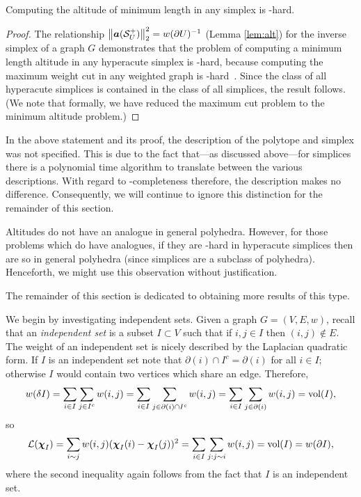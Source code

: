 \begin{lemma}
	\label{lem:altitude_hard}
	Computing the altitude of minimum length in any simplex is \NP-hard. 
\end{lemma}
\begin{proof}
	The relationship $\norm{\vb*{a}(\mathcal{S}^+_U)}_2^2 = w(\partial U)^{-1}$ (Lemma \ref{lem:alt}) for the inverse simplex of a graph $G$ demonstrates that the problem of computing a minimum length altitude in any hyperacute simplex is \NP-hard, because computing the  maximum weight cut in any weighted graph is \NP-hard~\cite{karp1972reducibility}.  Since the  class  of all hyperacute simplices is contained in the class of all simplices, the result follows.  (We note that formally, we have reduced the maximum  cut problem to the minimum altitude problem.) 
\end{proof}

\begin{remark} In  the above statement and its proof, the description of the polytope and simplex was not specified. This is due to the fact that---as discussed above---for simplices there is a polynomial time algorithm to translate between the various descriptions. With regard to \NP-completeness therefore, the description makes no difference. Consequently, we will continue to ignore this distinction for the remainder of this section. 
\end{remark}


\begin{remark}
Altitudes do  not have  an analogue in general polyhedra. However, for  those problems which do have analogues, 
if they are \NP-hard in hyperacute simplices then are so in general polyhedra (since simplices are a subclass of polyhedra). Henceforth, we might use this observation  without justification. 
\end{remark}


The remainder of this section is dedicated to obtaining more results of this type. 

We begin by investigating independent sets. Given a graph $G=(V,E,w)$, recall that an \emph{independent set} is a subset $I\subset V$ such that if $i,j\in I$ then $(i,j)\notin E$. 
The weight of an independent set is nicely described by the Laplacian quadratic form. If $I$ is an independent set note that $\partial(i)\cap I^c=\partial(i)$ for all $i\in  I$; otherwise $I$ would contain two vertices  which share an edge.
Therefore, 
\begin{align*}
w(\delta I) = \sum_{i\in  I}\sum_{j\in I^c} w(i,j) = \sum_{i\in I}\sum_{j\in \partial(i)\cap I^c} w(i,j) = \sum_{i\in  I}\sum_{j\in  \partial(i)}w(i,j) = \textnormal{vol}(I),
\end{align*}
so
\begin{align*}
    \mathcal{L}(\boldsymbol{\chi}_I) = \sum_{i\sim j}w(i,j)(\boldsymbol{\chi}_I(i)-\boldsymbol{\chi}_I(j))^2 = \sum_{i\in I}\sum_{j:j\sim i} w(i,j) = \textnormal{vol}(I)=w(\partial I),
\end{align*}
where the second inequality again follows from the fact that $I$ is an independent set. 

